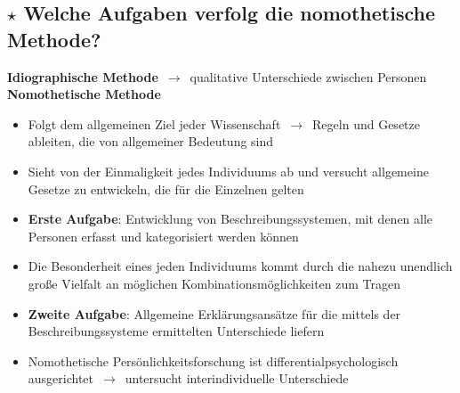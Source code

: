 \documentclass[a4paper,9pt,DIV=14]{scrartcl}
\begin{document}
\subsection{$\star$ Welche Aufgaben verfolg die nomothetische Methode?} %
    \textbf{Idiographische Methode} $\,\to\,$ qualitative Unterschiede zwischen Personen\\
    \textbf{Nomothetische Methode}
    \begin{itemize}\itemsep-0.5ex
        \item Folgt dem allgemeinen Ziel jeder Wissenschaft $\,\to\,$ Regeln und Gesetze ableiten, die von allgemeiner Bedeutung sind
        \item Sieht von der Einmaligkeit jedes Individuums ab und versucht allgemeine Gesetze zu entwickeln, die für die Einzelnen gelten
        \item \textbf{Erste Aufgabe}: Entwicklung von Beschreibungssystemen, mit denen alle Personen erfasst und kategorisiert werden können
        \item Die Besonderheit eines jeden Individuums kommt durch die nahezu unendlich große Vielfalt an möglichen Kombinationsmöglichkeiten zum Tragen
        \item \textbf{Zweite Aufgabe}: Allgemeine Erklärungsansätze für die mittels der Beschreibungssysteme ermittelten Unterschiede liefern
        \item Nomothetische Persönlichkeitsforschung ist differentialpsychologisch ausgerichtet $\,\to\,$ untersucht interindividuelle Unterschiede
    \end{itemize}
\end{document}
